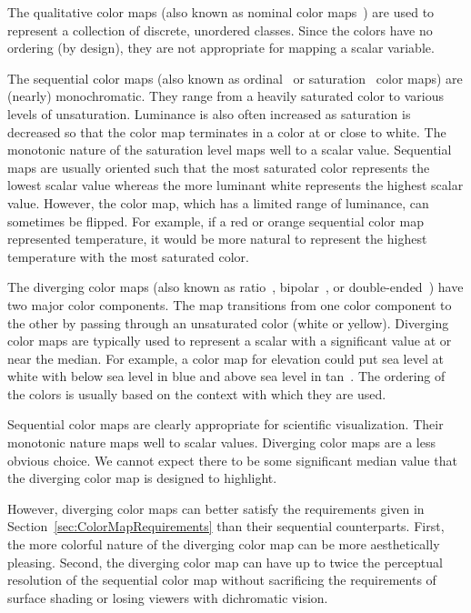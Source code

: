\documentclass{vgtc}                          %
\newcommand{\lcite}[1]{~\cite{#1}}
\begin{document}
The qualitative color maps (also known as nominal color maps\lcite{Ware04})
are used to represent a collection of discrete, unordered classes.  Since
the colors have no ordering (by design), they are not appropriate for
mapping a scalar variable.

The sequential color maps (also known as ordinal\lcite{Ware04} or
saturation\lcite{Rheingans99} color maps) are (nearly) monochromatic.  They
range from a heavily saturated color to various levels of unsaturation.
Luminance is also often increased as saturation is decreased so that the
color map terminates in a color at or close to white.  The monotonic nature
of the saturation level maps well to a scalar value.  Sequential maps are
usually oriented such that the most saturated color represents the lowest
scalar value whereas the more luminant white represents the highest scalar
value.  However, the color map, which has a limited range of luminance, can
sometimes be flipped.  For example, if a red or orange sequential color map
represented temperature, it would be more natural to represent the highest
temperature with the most saturated color.

The diverging color maps (also known as ratio\lcite{Ware04},
bipolar\lcite{Spence01}, or double-ended\lcite{Rheingans99}) have two major
color components.  The map transitions from one color component to the
other by passing through an unsaturated color (white or yellow).  Diverging
color maps are typically used to represent a scalar with a significant
value at or near the median.  For example, a color map for elevation could
put sea level at white with below sea level in blue and above sea level in
tan\lcite{Tufte97}.  The ordering of the colors is usually based on the
context with which they are used.

Sequential color maps are clearly appropriate for scientific visualization.
Their monotonic nature maps well to scalar values.  Diverging color maps
are a less obvious choice.  We cannot expect there to be some significant
median value that the diverging color map is designed to highlight.

However, diverging color maps can better satisfy the requirements given in
Section~\ref{sec:ColorMapRequirements} than their sequential counterparts.
First, the more colorful nature of the diverging color map can be more
aesthetically pleasing.  Second, the diverging color map can have up to
twice the perceptual resolution of the sequential color map without
sacrificing the requirements of surface shading or losing viewers
with dichromatic vision.
\end{document}
